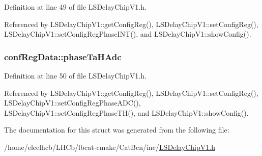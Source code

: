 Definition at line 49 of file LSDelayChipV1.h.

Referenced by LSDelayChipV1::getConfigReg(), LSDelayChipV1::setConfigReg(), LSDelayChipV1::setConfigRegPhaseINT(), and LSDelayChipV1::showConfig().\hypertarget{structconfRegData_a2e471f30b32e57270cb2edb0e420cf1b}{
\subsubsection[{phaseTaHAdc}]{ {\bf confRegData::phaseTaHAdc}}}
\label{structconfRegData_a2e471f30b32e57270cb2edb0e420cf1b}


Definition at line 50 of file LSDelayChipV1.h.

Referenced by LSDelayChipV1::getConfigReg(), LSDelayChipV1::setConfigReg(), LSDelayChipV1::setConfigRegPhaseADC(), LSDelayChipV1::setConfigRegPhaseTH(), and LSDelayChipV1::showConfig().

The documentation for this struct was generated from the following file:\begin{DoxyCompactItemize}
\item 
/home/eleclhcb/LHCb/lbcat-\/cmake/CatBcn/inc/\hyperlink{LSDelayChipV1_8h}{LSDelayChipV1.h}\end{DoxyCompactItemize}
